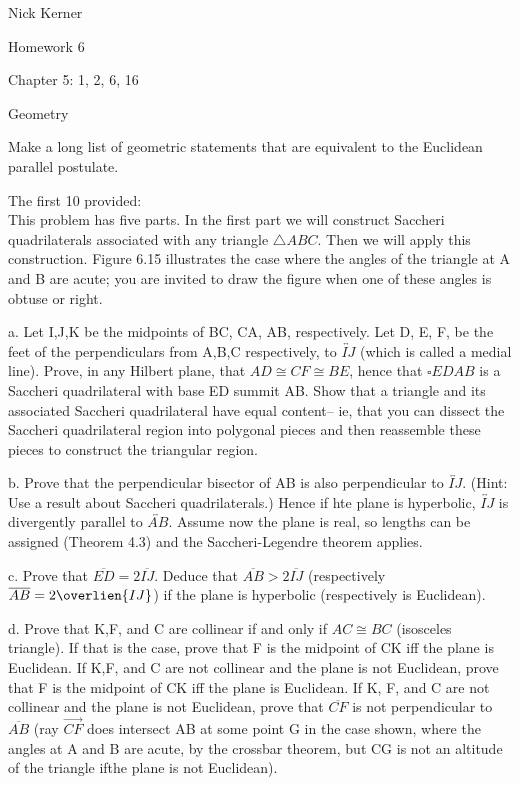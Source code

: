 \documentclass[12pt,letterpaper]{article}
\newcommand{\pro}[1]{\noindent {\bf #1}}
\newcommand{\prob}[1]{\newpage\noindent {\bf #1}}
\begin{document}
\begin{flushright}
Nick Kerner

Homework 6

Chapter 5: 1, 2, 6, 16

\end{flushright}
\begin{center}
\large{Geometry}\\
\end{center}

\pro{1}Make a long list of geometric statements that are equivalent to the Euclidean parallel postulate.

The first 10 provided: \\


\prob{2} This problem has five parts.  In the first part we will construct Saccheri quadrilaterals associated with any triangle $\triangle ABC$.  Then we will apply this construction.  Figure 6.15 illustrates the case where the angles of the triangle at A and B are acute;  you are invited to draw the figure when one of these angles is obtuse or right.  

a. Let I,J,K be the midpoints of BC, CA, AB, respectively.  Let D, E, F, be the feet of the perpendiculars from A,B,C respectively, to $\overleftrightarrow{IJ}$ (which is called a medial line).  Prove, in any Hilbert plane, that $AD \cong CF \cong BE$, hence that $\square EDAB$ is a Saccheri quadrilateral with base ED summit AB.  Show that a triangle and its associated Saccheri quadrilateral have equal content-- ie, that you can dissect the Saccheri quadrilateral region into polygonal pieces and then reassemble these pieces to construct the triangular region. 

b. Prove that the perpendicular bisector of AB is also perpendicular to $\overleftrightarrow{IJ}$. (Hint: Use a result about Saccheri quadrilaterals.)  Hence if hte plane is hyperbolic, $\overleftrightarrow{IJ}$ is divergently parallel to $\overleftrightarrow{AB}$.  Assume now the plane is real, so lengths can be assigned (Theorem 4.3) and the Saccheri-Legendre theorem applies. 

c. Prove that $\overline{ED} = 2\overline{IJ}$.  Deduce that $\overline{AB} > 2\overline{IJ}$ (respectively $\overline{AB} = 2\overlien{IJ}$) if the plane is hyperbolic (respectively is Euclidean).

d. Prove that K,F, and C are collinear if and only if $AC \cong BC$ (isosceles triangle).  If that is the case, prove that F is the midpoint of CK iff the plane is Euclidean.  If K,F, and C are not collinear and the plane is not Euclidean, prove that F is the midpoint of CK iff the plane is Euclidean.  If K, F, and C are not collinear and the plane is not Euclidean, prove that $\overline{CF}$ is not perpendicular to $\overline{AB}$ (ray $\overrightarrow{CF}$ does intersect AB at some point G in the case shown, where the angles at A and B are acute, by the crossbar theorem, but CG is not an altitude of the triangle ifthe plane is not Euclidean).
\end{document}
